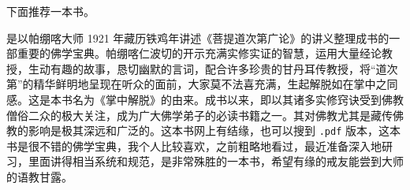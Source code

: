 下面推荐一本书。

\begin{book}[《掌中解脱》]
    是以帕绷喀大师 1921 年藏历铁鸡年讲述《菩提道次第广论》的讲义整理成书的一部重要的佛学宝典。帕绷喀仁波切的开示充满实修实证的智慧，运用大量经论教授，生动有趣的故事，恳切幽默的言词，配合许多珍贵的甘丹耳传教授，将“道次第”的精华鲜明地呈现在听众的面前，大家莫不法喜充满，生起解脱如在掌中之同感。这是本书名为《掌中解脱》的由来。成书以来，即以其诸多实修窍诀受到佛教僧俗二众的极大关注，成为广大佛学弟子的必读书籍之一。其对佛教尤其是藏传佛教的影响是极其深远和广泛的。这本书网上有结缘，也可以搜到 \texttt{.pdf} 版本，这本书是很不错的佛学宝典，我个人比较喜欢，之前粗略地看过，最近准备深入地研习，里面讲得相当系统和规范，是非常殊胜的一本书，希望有缘的戒友能尝到大师的语教甘露。
\end{book}
